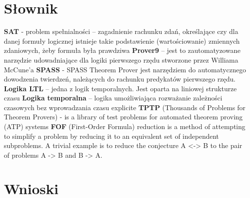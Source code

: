 \documentclass[a4paper,12pt]{article}
\begin{document}
\section{Słownik}
\noindent
\textbf{SAT} -  problem spełnialności – zagadnienie rachunku zdań, określające czy dla danej formuły logicznej istnieje takie podstawienie (wartościowanie) zmiennych zdaniowych, żeby formuła była prawdziwa \newline
\noindent
\textbf{Prover9} – jest to zautomatyzowane narzędzie udowadniające dla logiki pierwszego rzędu stworzone przez Williama McCune’a \newline
\noindent
\textbf{SPASS} - SPASS Theorem Prover jest narzędziem do automatycznego dowodzenia twierdzeń, należących do rachunku predykatów pierwszego rzędu. \newline
\noindent
\textbf{Logika LTL} – jedna z logik temporalnych. Jest oparta na liniowej strukturze czasu \newline
\noindent
\textbf{Logika temporalna} – logika umożliwiająca rozważanie zależności czasowych bez wprowadzania czasu explicite \newline
\noindent
\textbf{TPTP} (Thousands of Problems for Theorem Provers) - is a library of test problems for automated theorem proving (ATP) systems \newline
\noindent
\textbf{FOF} (First-Order Formula) reduction is a method of attempting to simplify a problem by reducing it to an equivalent set of independent subproblems. A trivial example is to reduce the conjecture A <-> B to the pair of problems A -> B and B -> A.  \newline







\newpage
\section{Wnioski}
\lipsum[1]
\end{document}
